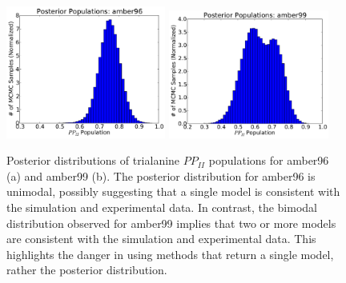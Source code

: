 \documentclass[journal=jacsat,manuscript=article]{achemso}
\begin{document}
\begin{figure}

\includegraphics[width=5.25cm]{figures/ALA3_amber96_PPII_MCMC.pdf}
\includegraphics[width=5.25cm]{figures/ALA3_amber99_PPII_MCMC.pdf}

\caption{
Posterior distributions of trialanine $PP_{II}$ populations for amber96 (a) and amber99 (b).  The posterior distribution for amber96 is unimodal, possibly suggesting that a single model is consistent with the simulation and experimental data.  In contrast, the bimodal distribution observed for amber99 implies that two or more models are consistent with the simulation and experimental data.  This highlights the danger in using methods that return a single model, rather the posterior distribution.  
}
\label{figure:ALA3_rama}
\end{figure}

\newpage
\end{document}
